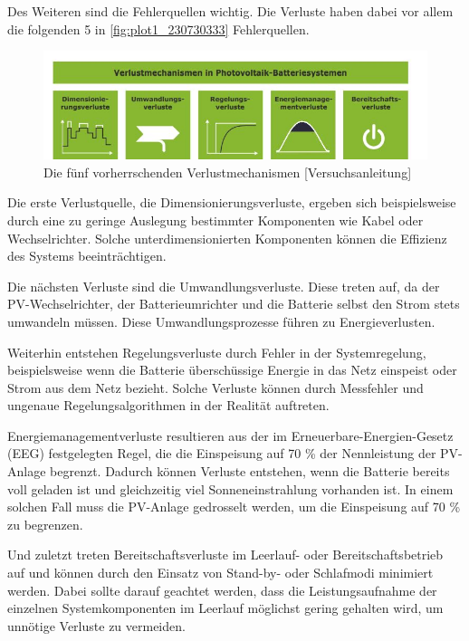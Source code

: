 Des Weiteren sind die Fehlerquellen wichtig. Die Verluste haben dabei vor allem die folgenden 5 in \autoref{fig:plot1_230730333} Fehlerquellen.

\begin{figure}[H]
    \centering
    \includegraphics[width=\textwidth]{Abbildungen/aaa.jpg}
    \caption{Die fünf vorherrschenden Verlustmechanismen [Versuchsanleitung]}
    \label{fig:plot1_230730333}
\end{figure}
Die erste Verlustquelle, die Dimensionierungsverluste, ergeben sich beispielsweise durch eine zu geringe Auslegung bestimmter Komponenten wie Kabel oder Wechselrichter. Solche unterdimensionierten Komponenten können die Effizienz des Systems beeinträchtigen.

Die nächsten Verluste sind die Umwandlungsverluste. Diese treten auf, da der PV-Wechselrichter, der Batterieumrichter und die Batterie selbst den Strom stets umwandeln müssen. Diese Umwandlungsprozesse führen zu Energieverlusten.

Weiterhin entstehen Regelungsverluste durch Fehler in der Systemregelung, beispielsweise wenn die Batterie überschüssige Energie in das Netz einspeist oder Strom aus dem Netz bezieht. Solche Verluste können durch Messfehler und ungenaue Regelungsalgorithmen in der Realität auftreten.

Energiemanagementverluste resultieren aus der im Erneuerbare-Energien-Gesetz (EEG) festgelegten Regel, die die Einspeisung auf 70 \% der Nennleistung der PV-Anlage begrenzt. Dadurch können Verluste entstehen, wenn die Batterie bereits voll geladen ist und gleichzeitig viel Sonneneinstrahlung vorhanden ist. In einem solchen Fall muss die PV-Anlage gedrosselt werden, um die Einspeisung auf 70 \% zu begrenzen.

Und zuletzt treten Bereitschaftsverluste im Leerlauf- oder Bereitschaftsbetrieb auf und können durch den Einsatz von Stand-by- oder Schlafmodi minimiert werden. Dabei sollte darauf geachtet werden, dass die Leistungsaufnahme der einzelnen Systemkomponenten im Leerlauf möglichst gering gehalten wird, um unnötige Verluste zu vermeiden.  
